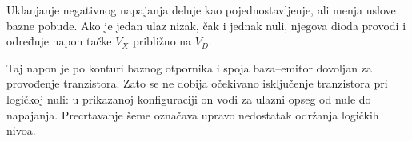 Uklanjanje negativnog napajanja deluje kao pojednostavljenje, ali menja uslove bazne pobude. Ako je jedan ulaz nizak, čak i jednak nuli, njegova dioda provodi i određuje napon tačke $V_X$ približno na $V_D$.

Taj napon je po konturi baznog otpornika i spoja baza–emitor dovoljan za provođenje tranzistora. Zato se ne dobija očekivano isključenje tranzistora pri logičkoj nuli: u prikazanoj konfiguraciji on vodi za ulazni opseg od nule do napajanja. Precrtavanje šeme označava upravo nedostatak održanja logičkih nivoa.

